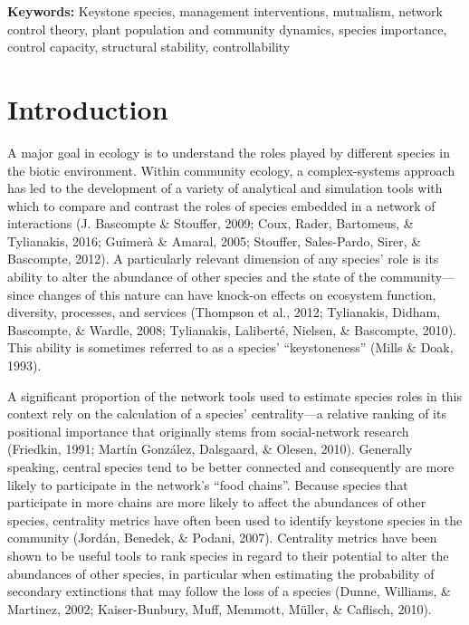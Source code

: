 \documentclass[a4paper]{artikel1}
\theoremstyle{definition}
\theoremstyle{definition}
\theoremstyle{definition}
\theoremstyle{remark}
\begin{document}
\textbf{Keywords:} Keystone species, management interventions,
mutualism, network control theory, plant population and community
dynamics, species importance, control capacity, structural stability,
controllability

\clearpage

\section{Introduction}\label{introduction}

A major goal in ecology is to understand the roles played by different
species in the biotic environment. Within community ecology, a
complex-systems approach has led to the development of a variety of
analytical and simulation tools with which to compare and contrast the
roles of species embedded in a network of interactions (J. Bascompte \&
Stouffer, 2009; Coux, Rader, Bartomeus, \& Tylianakis, 2016; Guimerà \&
Amaral, 2005; Stouffer, Sales-Pardo, Sirer, \& Bascompte, 2012). A
particularly relevant dimension of any species' role is its ability to
alter the abundance of other species and the state of the
community---since changes of this nature can have knock-on effects on
ecosystem function, diversity, processes, and services (Thompson et al.,
2012; Tylianakis, Didham, Bascompte, \& Wardle, 2008; Tylianakis,
Laliberté, Nielsen, \& Bascompte, 2010). This ability is sometimes
referred to as a species' ``keystoneness'' (Mills \& Doak, 1993).

A significant proportion of the network tools used to estimate species
roles in this context rely on the calculation of a species'
centrality---a relative ranking of its positional importance that
originally stems from social-network research (Friedkin, 1991; Martín
González, Dalsgaard, \& Olesen, 2010). Generally speaking, central
species tend to be better connected and consequently are more likely to
participate in the network's ``food chains''. Because species that
participate in more chains are more likely to affect the abundances of
other species, centrality metrics have often been used to identify
keystone species in the community (Jordán, Benedek, \& Podani, 2007).
Centrality metrics have been shown to be useful tools to rank species in
regard to their potential to alter the abundances of other species, in
particular when estimating the probability of secondary extinctions that
may follow the loss of a species (Dunne, Williams, \& Martinez, 2002;
Kaiser-Bunbury, Muff, Memmott, Müller, \& Caflisch, 2010).
\end{document}
